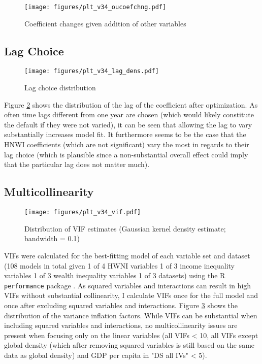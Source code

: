 \documentclass[11pt, authoryear]{elsarticle}
\begin{document}
\begin{landscape}

\begin{figure}[htbp]
\centering
\texttt{[image: figures/plt\_v34\_oucoefchng.pdf]}
\caption{\label{fig:oucoefchng}Coefficient changes given addition of other variables}
\end{figure}

\end{landscape}




\subsection{Lag Choice}
\label{app_lagchoice}
\begin{figure}[htbp]
\centering
\texttt{[image: figures/plt\_v34\_lag\_dens.pdf]}
\caption{\label{fig:lag_dens}Lag choice distribution}
\end{figure}

Figure \ref{fig:lag_dens} shows the distribution of the lag of the coefficient after optimization.
As often time lags different from one year are chosen (which would likely constitute the default if they were not varied), it can be seen that allowing the lag to vary substantially increases model fit. 
It furthermore seems to be the case that the HNWI coefficients (which are not significant) vary the most in regards to their lag choice (which is plausible since a non-substantial overall effect could imply that the particular lag does not matter much). 




\subsection{Multicollinearity}
\label{app_vif}
\begin{figure}[htbp]
\centering
\texttt{[image: figures/plt\_v34\_vif.pdf]}
\caption{\label{fig:vif}Distribution of VIF estimates (Gaussian kernel density estimate; bandwidth = 0.1)}
\end{figure}


VIFs were calculated for the best-fitting model of each variable set and dataset (108 models in total given 1 of 4 HWNI variables \texttimes{} 1 of 3 income inequality variables \texttimes{} 1 of 3 wealth inequality variables \texttimes{} 1 of 3 datasets) using the R \texttt{performance} package \citep{Luedecke_etal_2021_performance}. 
As squared variables and interactions can result in high VIFs without substantial collinearity, I calculate VIFs once for the full model and once after excluding squared variables and interactions.
Figure \ref{fig:vif} shows the distribution of the variance inflation factors.
While VIFs can be substantial when including squared variables and interactions, no multicollinearity issues are present when focusing only on the linear variables (all VIFs < 10, all VIFs except global density (which after removing squared variables is still based on the same data as global density) and GDP per capita in "DS all IVs" < 5).
\end{document}
